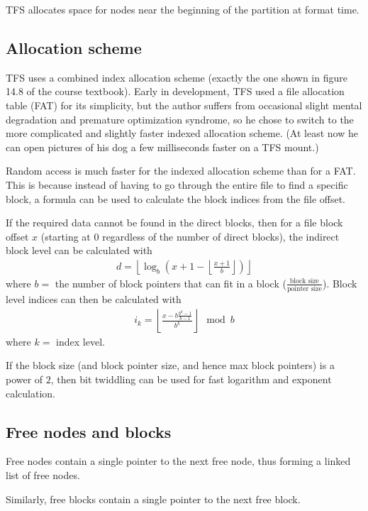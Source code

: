 \documentclass{report}
\newcommand{\floor}[1]{\left\lfloor #1 \right\rfloor}
\begin{document}
TFS allocates space for nodes near the beginning of the partition at format time.

\subsection*{Allocation scheme}

TFS uses a combined index allocation scheme
(exactly the one shown in figure 14.8 of the course textbook).
Early in development, TFS used a file allocation table (FAT) for its simplicity,
but the author suffers from occasional slight mental degradation and premature optimization syndrome,
so he chose to switch to the more complicated and slightly faster indexed allocation scheme.
(At least now he can open pictures of his dog a few milliseconds faster on a TFS mount.)

Random access is much faster for the indexed allocation scheme than for a FAT.
This is because instead of having to go through the entire file to find a specific block,
a formula can be used to calculate the block indices from the file offset.

If the required data cannot be found in the direct blocks,
then for a file block offset $x$
(starting at $0$ regardless of the number of direct blocks),
the indirect block level can be calculated with
\begin{align*}
	d = \floor{\log_b{\left( x + 1 - \floor{\frac{x + 1}{b}} \right)}}
\end{align*}
where $b =$ the number of block pointers that can fit in a block
($\frac{\text{block size}}{\text{pointer size}}$).
Block level indices can then be calculated with
\begin{align*}
	i_k = \floor{\frac{x - b \frac{b^d - 1}{b - 1}}{b^k}} \mod b
\end{align*}
where $k =$ index level.

If the block size (and block pointer size, and hence max block pointers) is a power of $2$,
then bit twiddling can be used for fast logarithm and exponent calculation.

\subsection*{Free nodes and blocks}

Free nodes contain a single pointer to the next free node,
thus forming a linked list of free nodes.

Similarly, free blocks contain a single pointer to the next free block.
\end{document}
